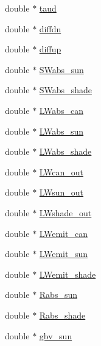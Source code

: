 \begin{DoxyCompactItemize}
\item 
double $\ast$ \hyperlink{class_vertical_canopy_class_a5a280c369b7a40d264600c9ccf3bb087}{taud}
\item 
double $\ast$ \hyperlink{class_vertical_canopy_class_a80b57f681179e78364a40ef2c72c0696}{diffdn}
\item 
double $\ast$ \hyperlink{class_vertical_canopy_class_adf44253be7cfe7c1e64abcd2f3fd7045}{diffup}
\item 
double $\ast$ \hyperlink{class_vertical_canopy_class_ab30beec9c3818f9baffb5990e6b484c7}{S\+Wabs\+\_\+sun}
\item 
double $\ast$ \hyperlink{class_vertical_canopy_class_ac8e701e06748712517a065b998e21833}{S\+Wabs\+\_\+shade}
\item 
double $\ast$ \hyperlink{class_vertical_canopy_class_a6616a1ee24c56d6bd92962e4a9c5919b}{L\+Wabs\+\_\+can}
\item 
double $\ast$ \hyperlink{class_vertical_canopy_class_a13104ea4c1c82de6ab2bef08db2ba7ec}{L\+Wabs\+\_\+sun}
\item 
double $\ast$ \hyperlink{class_vertical_canopy_class_ae299d38f03449eb1c055357929abba37}{L\+Wabs\+\_\+shade}
\item 
double $\ast$ \hyperlink{class_vertical_canopy_class_a8996158fa2b192e9af15850e237d6460}{L\+Wcan\+\_\+out}
\item 
double $\ast$ \hyperlink{class_vertical_canopy_class_ac76a73df55f05d24ee538af32c2d3969}{L\+Wsun\+\_\+out}
\item 
double $\ast$ \hyperlink{class_vertical_canopy_class_ad622b4bd741bd25d95a1f52df53a94d7}{L\+Wshade\+\_\+out}
\item 
double $\ast$ \hyperlink{class_vertical_canopy_class_abaf10bd837a7e45337f9393726a9184f}{L\+Wemit\+\_\+can}
\item 
double $\ast$ \hyperlink{class_vertical_canopy_class_ab91193817d5ba083cde2278318c385c3}{L\+Wemit\+\_\+sun}
\item 
double $\ast$ \hyperlink{class_vertical_canopy_class_af1f8cdac4adc92212ed1c7112ae1a994}{L\+Wemit\+\_\+shade}
\item 
double $\ast$ \hyperlink{class_vertical_canopy_class_a03ef4a59794a17cc3286416d5a8612ef}{Rabs\+\_\+sun}
\item 
double $\ast$ \hyperlink{class_vertical_canopy_class_af28dedc52dfe94ce923010597ad8c673}{Rabs\+\_\+shade}
\item 
double $\ast$ \hyperlink{class_vertical_canopy_class_a1ff5396a49b07f7c791c0675bfb810bd}{gbv\+\_\+sun}
\item 

\end{DoxyCompactItemize}
